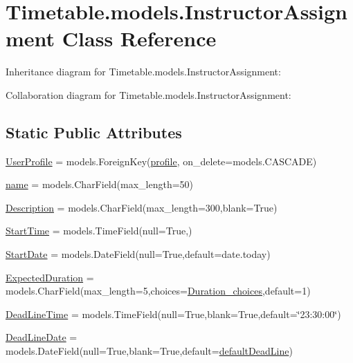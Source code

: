 \hypertarget{classTimetable_1_1models_1_1InstructorAssignment}{}\section{Timetable.\+models.\+Instructor\+Assignment Class Reference}
\label{classTimetable_1_1models_1_1InstructorAssignment}


Inheritance diagram for Timetable.\+models.\+Instructor\+Assignment\+:


Collaboration diagram for Timetable.\+models.\+Instructor\+Assignment\+:
\subsection*{Static Public Attributes}
\begin{DoxyCompactItemize}
\item 
\hyperlink{classTimetable_1_1models_1_1InstructorAssignment_a64f231cb4bd0aa520af50783b061152b}{User\+Profile} = models.\+Foreign\+Key(\hyperlink{classprofiles_1_1models_1_1profile}{profile}, on\+\_\+delete=models.\+C\+A\+S\+C\+A\+DE)
\item 
\hyperlink{classTimetable_1_1models_1_1InstructorAssignment_a88f88adb93da287ea6257d10f644deba}{name} = models.\+Char\+Field(max\+\_\+length=50)
\item 
\hyperlink{classTimetable_1_1models_1_1InstructorAssignment_a41098b5ff53c4527338da898d1c8ce60}{Description} = models.\+Char\+Field(max\+\_\+length=300,blank=True)
\item 
\hyperlink{classTimetable_1_1models_1_1InstructorAssignment_a3f4edc7224eef181116da64d9fb3e833}{Start\+Time} = models.\+Time\+Field(null=True,)
\item 
\hyperlink{classTimetable_1_1models_1_1InstructorAssignment_a4118305183920242785ffd38f427504d}{Start\+Date} = models.\+Date\+Field(null=True,default=date.\+today)
\item 
\hyperlink{classTimetable_1_1models_1_1InstructorAssignment_a01e40f725e26619a0274fdd01d7c0a0d}{Expected\+Duration} = models.\+Char\+Field(max\+\_\+length=5,choices=\hyperlink{namespaceTimetable_1_1models_a3de5e5d97c7dbbfd08e212b9d1ad3ec5}{Duration\+\_\+choices},default=\textquotesingle{}1\textquotesingle{})
\item 
\hyperlink{classTimetable_1_1models_1_1InstructorAssignment_a6decd0faec3c1764e6fa139946f94a61}{Dead\+Line\+Time} = models.\+Time\+Field(null=True,blank=True,default=\char`\"{}23\+:30\+:00\char`\"{})
\item 
\hyperlink{classTimetable_1_1models_1_1InstructorAssignment_a44347cd7e7a96f8a8c7ed68ca63fbf08}{Dead\+Line\+Date} = models.\+Date\+Field(null=True,blank=True,default=\hyperlink{namespaceTimetable_1_1models_a6b1be2b87de430a3f0820a4908c608fd}{default\+Dead\+Line})
\end{DoxyCompactItemize}


